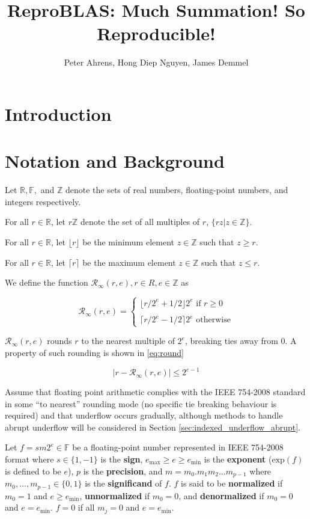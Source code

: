 \documentclass[12pt]{article}
\author{Peter Ahrens, Hong Diep Nguyen, James Demmel}
\title{ReproBLAS: Much Summation! So Reproducible!}
\providecommand{\R}{\ensuremath{\mathbb{R}}}
\providecommand{\F}{\ensuremath{\mathbb{F}}}
\providecommand{\Z}{\ensuremath{\mathbb{Z}}}
\providecommand{\exp}{\ensuremath{\text{exp}}}
\providecommand{\min}{\ensuremath{\text{min}}}
\providecommand{\max}{\ensuremath{\text{max}}}
\providecommand{\roundtonearestinfty}{\ensuremath{\mathcal{R}_\text{$\infty$}}}
\theoremstyle{definition}
\numberwithin{equation}{section}
\numberwithin{figure}{section}
\begin{document}
\noindent
\maketitle
\tableofcontents
\newpage
\section{Introduction}
\section{Notation and Background}
  Let $\R, \F, $ and $\Z$ denote the sets of real numbers, floating-point numbers, and integers respectively.

  For all $r \in \R$, let $r\Z$ denote the set of all multiples of $r$, $\{rz | z \in \Z\}$.

  For all $r \in \R$, let $\lfloor r \rfloor$ be the minimum element $z \in \Z$ such that $z \geq r$.

  For all $r \in \R$, let $\lceil r \rceil$ be the maximum element $z \in \Z$ such that $z \leq r$.

  We define the function $\roundtonearestinfty(r, e), r \in R, e \in \Z$ as

  \begin{equation}
    \roundtonearestinfty(r, e) = \begin{cases}\lfloor r/2^e + 1/2 \rfloor 2^e \text{ if } r \geq 0\\ \\ \lceil r/2^e - 1/2 \rceil 2^e \text{ otherwise}\end{cases}
  \end{equation}

  $\roundtonearestinfty(r, e)$ rounds $r$ to the nearest multiple of $2^e$, breaking ties away from 0. A property of such rounding is shown in  \eqref{eq:round}

  \begin{equation}
    \bigl|r - \roundtonearestinfty(r, e)\bigr| \leq 2^{e - 1}
    \label{eq:round}
  \end{equation}

  Assume that floating point arithmetic complies with the IEEE 754-2008 standard \cite{ieee754} in some ``to nearest'' rounding mode (no specific tie breaking behaviour is required) and that underflow occurs gradually, although methods to handle abrupt underflow will be considered in Section \ref{sec:indexed_underflow_abrupt}.

  Let $f = sm2^e \in \F$ be a floating-point number represented in IEEE 754-2008 format \cite{ieee754} where $s \in \{1, -1\}$ is the \textbf{sign}, $e_{\max} \geq e \geq e_{\min}$ is the \textbf{exponent} ($\exp(f)$ is defined to be $e$), $p$ is the \textbf{precision}, and $m = m_0.m_1m_2...m_{p-1}$ where $m_0, ..., m_{p - 1} \in \{0, 1\}$ is the \textbf{significand} of $f$. $f$ is said to be \textbf{normalized} if $m_0 = 1$ and $e \geq e_{\min}$, \textbf{unnormalized} if $m_0 = 0$, and \textbf{denormalized} if $m_0 = 0$ and $e = e_{\min}$. $f = 0$ if all $m_j = 0$ and $e = e_{\min}$.
\end{document}
